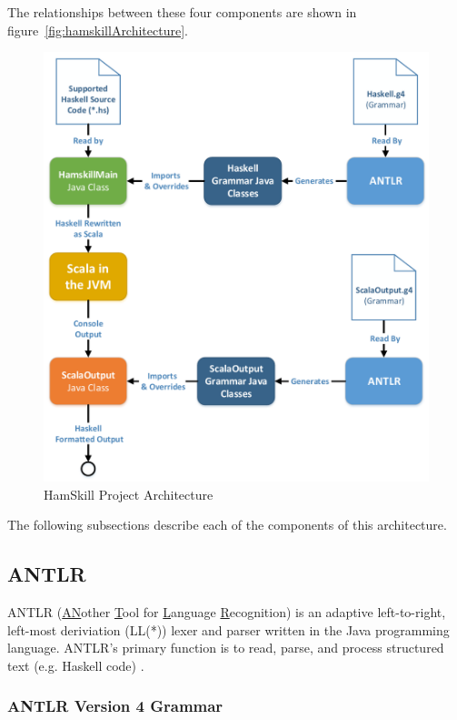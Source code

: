 \documentclass{report}
\begin{document}
The relationships between these four components are shown in figure~\ref{fig:hamskillArchitecture}.

\begin{figure}[ht!]
	\centering
		\includegraphics[width=1.0\textwidth]{images/cs252_project_diagram_cropped.pdf}
	\caption{HamSkill Project Architecture}
\end{figure}\label{fig:hamskillArchitecture}

The following subsections describe each of the components of this architecture.

\subsection{ANTLR}

ANTLR (\underline{AN}other \underline{T}ool for \underline{L}anguage \underline{R}ecognition) is an adaptive left-to-right, left-most deriviation (LL(*)) lexer and parser written in the Java programming language.  ANTLR's primary function is to read, parse, and process structured text (e.g. Haskell code) \cite{antlrDefinitiveReference}.  

\subsubsection{ANTLR Version 4 Grammar}
\end{document}
